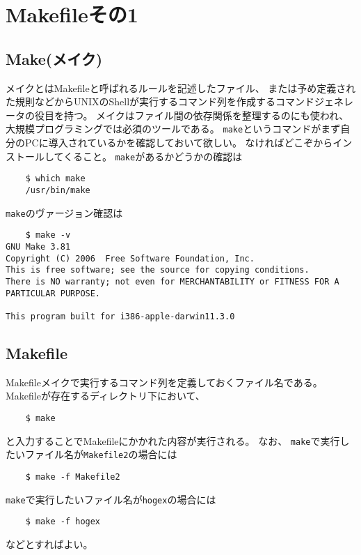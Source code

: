  \section{Makefileその1}
 
 

 \subsection{Make(メイク)}

 メイクとはMakefileと呼ばれるルールを記述したファイル、
 または予め定義された規則などからUNIXのShellが実行するコマンド列を作成するコマンドジェネレータの役目を持つ。
 メイクはファイル間の依存関係を整理するのにも使われ、大規模プログラミングでは必須のツールである。
 \verb|make|というコマンドがまず自分のPCに導入されているかを確認しておいて欲しい。
 なければどこぞからインストールしてくること。
 \verb|make|があるかどうかの確認は
 \begin{verbatim}
	$ which make
	/usr/bin/make
 \end{verbatim}
\verb|make|のヴァージョン確認は
 \begin{verbatim}
	$ make -v
GNU Make 3.81
Copyright (C) 2006  Free Software Foundation, Inc.
This is free software; see the source for copying conditions.
There is NO warranty; not even for MERCHANTABILITY or FITNESS FOR A
PARTICULAR PURPOSE.

This program built for i386-apple-darwin11.3.0
 \end{verbatim}
 
 
 
 \subsection{Makefile}
 Makefileメイクで実行するコマンド列を定義しておくファイル名である。
 Makefileが存在するディレクトリ下において、
 \begin{verbatim}
	$ make
 \end{verbatim}
 と入力することでMakefileにかかれた内容が実行される。
 なお、
 \verb|make|で実行したいファイル名が\verb|Makefile2|の場合には
 \begin{verbatim}
	$ make -f Makefile2
 \end{verbatim}
 \verb|make|で実行したいファイル名が\verb|hogex|の場合には
 \begin{verbatim}
	$ make -f hogex
 \end{verbatim}
 などとすればよい。
 
